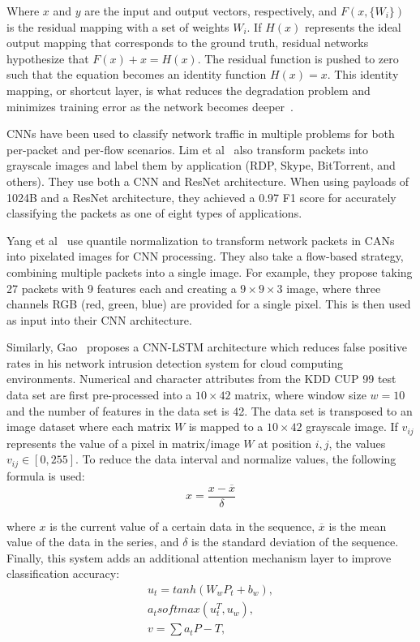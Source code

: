 Where $x$ and $y$ are the input and output vectors, respectively, and $F(x, \{W_i\})$ is the residual mapping with a set of weights $W_i$. If $H(x)$ represents the ideal output mapping that corresponds to the ground truth, residual networks hypothesize that $F(x) + x = H(x)$. The residual function is pushed to zero such that the equation becomes an identity function $H(x) = x$. This identity mapping, or shortcut layer, is what reduces the degradation problem and minimizes training error as the network becomes deeper~\cite{resnet}.

CNNs have been used to classify network traffic in multiple problems for both per-packet and per-flow scenarios. Lim et al~\cite{lim2019network} also transform packets into grayscale images and label them by application (RDP, Skype, BitTorrent, and others). They use both a CNN and ResNet architecture. When using payloads of 1024B and a ResNet architecture, they achieved a 0.97 F1 score for accurately classifying the packets as one of eight types of applications.

Yang et al~\cite{yang2022} use quantile normalization to transform network packets in CANs into pixelated images for CNN processing. They also take a flow-based strategy, combining multiple packets into a single image. For example, they propose taking 27 packets with 9 features each and creating a $9 \times 9 \times 3$ image, where three channels RGB (red, green, blue) are provided for a single pixel. This is then used as input into their CNN architecture.

Similarly, Gao~\cite{Gao2022} proposes a CNN-LSTM architecture which reduces false positive rates in his network intrusion detection system for cloud computing environments. Numerical and character attributes from the KDD CUP 99 test data set are first pre-processed into a $10 \times 42$ matrix, where window size $w = 10$ and the number of features in the data set is 42. The data set is transposed to an image dataset where each matrix $W$ is mapped to a $10 \times 42$ grayscale image. If $v_{ij}$ represents the value of a pixel in matrix/image $W$ at position $i,j$, the values $v_{ij} \in [0,255]$. To reduce the data interval and normalize values, the following formula is used:
\begin{equation}
    x = \frac{x-\overline{x}}{\delta}
\end{equation}

where $x$ is the current value of a certain data in the sequence, $\overline{x}$ is the mean value of the data in the series, and $\delta$ is the standard deviation of the sequence. Finally, this system adds an additional attention mechanism layer to improve classification accuracy:
\begin{equation}
    \begin{split}
    u_t = tanh(W_wP_t + b_w), \\
    a_t softmax(u_t^T, u_w), \\
    v = \sum a_tP-T,
    \end{split}
\end{equation}

